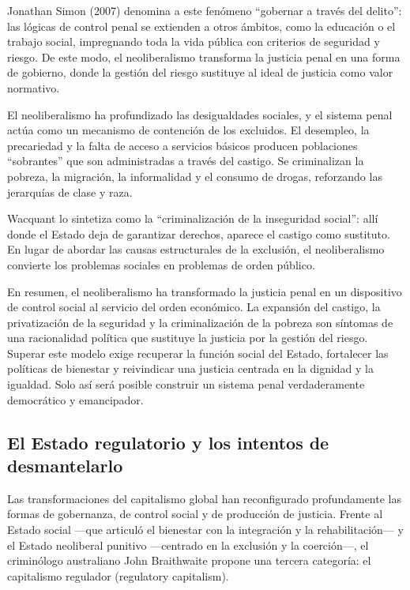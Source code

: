 \documentclass[
  spanish,
  letterpaper,
  DIV=11,
  numbers=noendperiod]{scrreprt}
\begin{document}
Jonathan Simon (2007) denomina a este fenómeno ``gobernar a través del
delito'': las lógicas de control penal se extienden a otros ámbitos,
como la educación o el trabajo social, impregnando toda la vida pública
con criterios de seguridad y riesgo. De este modo, el neoliberalismo
transforma la justicia penal en una forma de gobierno, donde la gestión
del riesgo sustituye al ideal de justicia como valor normativo.

El neoliberalismo ha profundizado las desigualdades sociales, y el
sistema penal actúa como un mecanismo de contención de los excluidos. El
desempleo, la precariedad y la falta de acceso a servicios básicos
producen poblaciones ``sobrantes'' que son administradas a través del
castigo. Se criminalizan la pobreza, la migración, la informalidad y el
consumo de drogas, reforzando las jerarquías de clase y raza.

Wacquant lo sintetiza como la ``criminalización de la inseguridad
social'': allí donde el Estado deja de garantizar derechos, aparece el
castigo como sustituto. En lugar de abordar las causas estructurales de
la exclusión, el neoliberalismo convierte los problemas sociales en
problemas de orden público.

En resumen, el neoliberalismo ha transformado la justicia penal en un
dispositivo de control social al servicio del orden económico. La
expansión del castigo, la privatización de la seguridad y la
criminalización de la pobreza son síntomas de una racionalidad política
que sustituye la justicia por la gestión del riesgo. Superar este modelo
exige recuperar la función social del Estado, fortalecer las políticas
de bienestar y reivindicar una justicia centrada en la dignidad y la
igualdad. Solo así será posible construir un sistema penal
verdaderamente democrático y emancipador.

\subsection{El Estado regulatorio y los intentos de
desmantelarlo}\label{el-estado-regulatorio-y-los-intentos-de-desmantelarlo}

Las transformaciones del capitalismo global han reconfigurado
profundamente las formas de gobernanza, de control social y de
producción de justicia. Frente al Estado social ---que articuló el
bienestar con la integración y la rehabilitación--- y el Estado
neoliberal punitivo ---centrado en la exclusión y la coerción---, el
criminólogo australiano John Braithwaite propone una tercera categoría:
el capitalismo regulador (regulatory capitalism).
\end{document}

